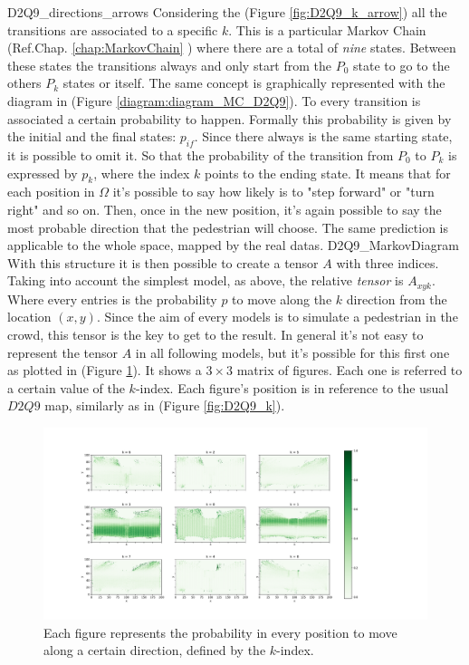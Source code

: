 \documentclass[class=article, crop=false]{standalone}
\begin{document}
	{D2Q9_directions_arrows}
Considering the (Figure \ref{fig:D2Q9_k_arrow}) all the transitions are associated to a specific $k$.
This is a particular Markov Chain (Ref.Chap. \ref{chap:MarkovChain} ) where there are a total of \emph{nine} states.
Between these states the transitions always and only start from the $P_0$ state to go to the others $P_k$ states or itself.
The same concept is graphically represented with the diagram in (Figure \ref{diagram:diagram_MC_D2Q9}).
To every transition is associated a certain probability to happen.
Formally this probability is given by the initial and the final states: $p_{if}$.
Since there always is the same starting state, it is possible to omit it.
So that the probability of the transition from $P_0$ to $P_k$ is expressed by $p_k$, where the index $k$ points to the ending state.
It means that for each position in $\Omega$ it's possible to say how likely is to "step forward" or "turn right" and so on.
Then, once in the new position, it's again possible to say the most probable direction that the pedestrian will choose.
The same prediction is applicable to the whole space, mapped by the real datas.
	{D2Q9_MarkovDiagram}
With this structure it is then possible to create a tensor $A$ with three indices.
Taking into account the simplest model, as above, the relative \emph{tensor} is $A_{x y k}$.
Where every entries is the probability $p$ to move along the $k$ direction from the location $(x, y)$.
Since the aim of every models is to simulate a pedestrian in the crowd, this tensor is the key to get to the result.
In general it's not easy to represent the tensor $A$ in all following models, but it's possible for this first one as plotted in (Figure \ref{fig:TensorA_D2Q9}).
It shows a $3\times3$ matrix of figures.
Each one is referred to a certain value of the $k$-index.
Each figure's position is in reference to the usual $D2Q9$ map, similarly as in (Figure \ref{fig:D2Q9_k}).

\begin{figure}[h!]
\centering
\includegraphics[scale=0.35]{fig/figure_trainf10_all_trajectories_Dx200_Dy100_TensorA_D2Q9}
\captionsetup{width=.6\linewidth}
\caption{Each figure represents the probability in every position to move along a certain direction, defined by the $k$-index.}
\label{fig:TensorA_D2Q9}
\end{figure}
\end{document}
